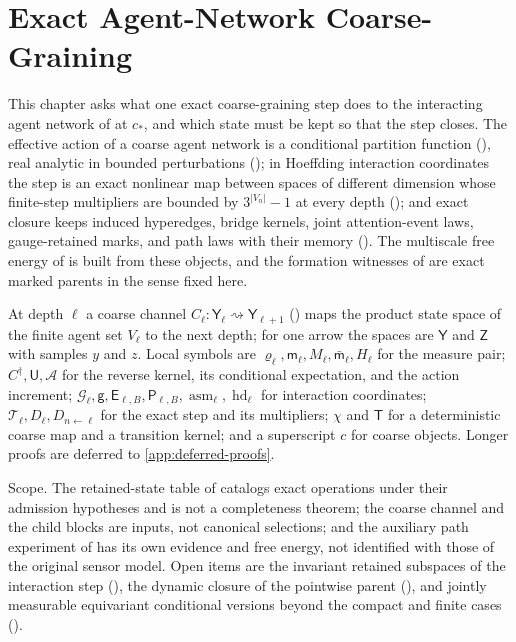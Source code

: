 \chapter{Exact Agent-Network Coarse-Graining}
\label{ch:agent-network-rg}

This chapter asks what one exact coarse-graining step does to the interacting
agent network of  at $c_*$, and which state must
be kept so that the step closes. The effective action of a coarse agent network
is a conditional partition function (), real
analytic in bounded perturbations (); in
Hoeffding interaction coordinates the step is an exact nonlinear map between
spaces of different dimension whose finite-step multipliers are bounded by
$3^{\lvert V_n\rvert}-1$ at every depth
(); and exact closure keeps induced
hyperedges, bridge kernels, joint attention-event laws, gauge-retained marks, and
path laws with their memory (). The multiscale free
energy of  is built from these objects, and the
formation witnesses of  are exact marked parents
in the sense fixed here.

At depth $\ell$ a coarse channel $C_\ell:\mathsf Y_\ell\rightsquigarrow\mathsf
Y_{\ell+1}$ () maps the product state space of the
finite agent set $V_\ell$ to the next depth; for one arrow the spaces are
$\mathsf Y$ and $\mathsf Z$ with samples $y$ and $z$. Local symbols are
$\varrho_\ell,\mathsf m_\ell,M_\ell,\bar{\mathsf m}_\ell,H_\ell$ for the measure pair;
$C^\dagger,\mathsf U,\mathcal A$ for the reverse kernel, its conditional
expectation, and the action increment; $\mathcal G_\ell,\mathsf g,\mathsf
E_{\ell,B},\mathsf P_{\ell,B},\operatorname{asm}_\ell,\operatorname{hd}_\ell$ for
interaction coordinates; $\mathcal T_\ell,D_\ell,D_{n\leftarrow\ell}$ for the exact
step and its multipliers; $\chi$ and $\mathsf T$ for a deterministic coarse map and
a transition kernel; and a superscript $c$ for coarse objects. Longer proofs are
deferred to \cref{app:deferred-proofs}.

Scope. The retained-state table of  catalogs exact
operations under their admission hypotheses and is not a completeness theorem;
the coarse channel and the child blocks are inputs, not canonical selections; and
the auxiliary path experiment of  has its own
evidence and free energy, not identified with those of the original sensor model.
 Open items are the invariant retained subspaces of the
interaction step (), the dynamic closure
of the pointwise parent (), and jointly
measurable equivariant conditional versions beyond the compact and finite cases
().

